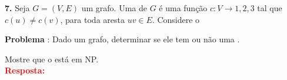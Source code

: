 
\noindent\textbf{7.} Seja $G = (V, E)$ um grafo. Uma  de $G$ é uma função $c : V \rightarrow {1, 2, 3}$ tal que $c(u) \neq c(v)$, para toda aresta $uv \in E$. Considere o

\indent\textbf{Problema} : Dado um grafo, determinar se ele tem ou não uma .

Mostre que o  está em NP.\\[6pt]
\textcolor{red}{\textbf{Resposta:}}